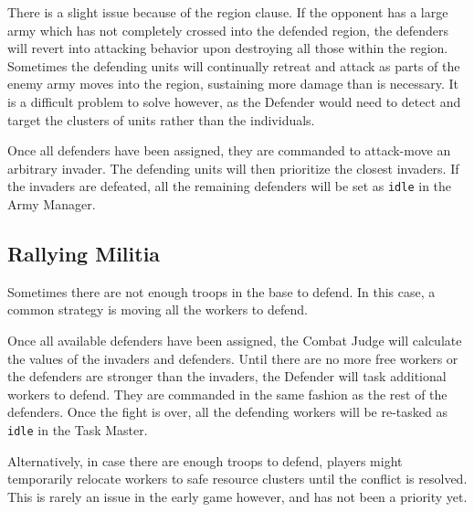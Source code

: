 	There is a slight issue because of the region clause. If the opponent has a large army which has not completely crossed into the defended region, the defenders will revert into attacking behavior upon destroying all those within the region. Sometimes the defending units will continually retreat and attack as parts of the enemy army moves into the region, sustaining more damage than is necessary. It is a difficult problem to solve however, as the Defender would need to detect and target the clusters of units rather than the individuals.

	Once all defenders have been assigned, they are commanded to attack-move an arbitrary invader. The defending units will then prioritize the closest invaders. If the invaders are defeated, all the remaining defenders will be set as \texttt{idle} in the Army Manager.

	\subsection*{Rallying Militia}
	Sometimes there are not enough troops in the base to defend. In this case, a common strategy is moving all the workers to defend.
	
	Once all available defenders have been assigned, the Combat Judge will calculate the values of the invaders and defenders. Until there are no more free workers or the defenders are stronger than the invaders, the Defender will task additional workers to defend. They are commanded in the same fashion as the rest of the defenders. Once the fight is over, all the defending workers will be re-tasked as \texttt{idle} in the Task Master.

	Alternatively, in case there are enough troops to defend, players might temporarily relocate workers to safe resource clusters until the conflict is resolved. This is rarely an issue in the early game however, and has not been a priority yet.